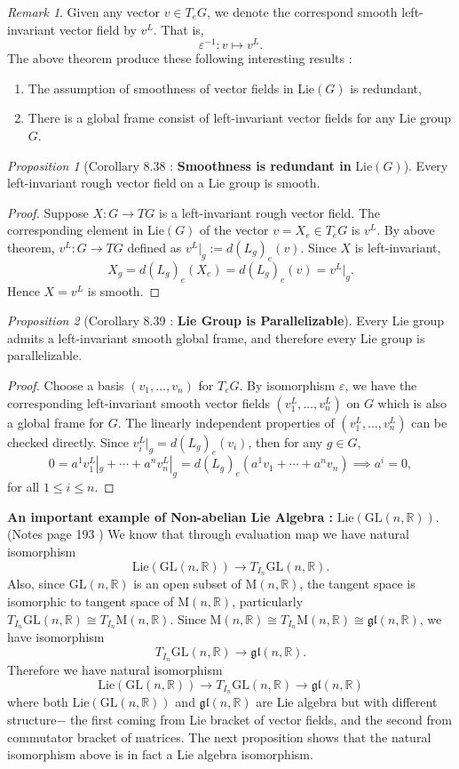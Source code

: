 \documentclass[a4paper]{article}
\theoremstyle{remark}
\newtheorem*{remark}{Remark}
\newtheorem{prop}{Proposition}
\newcommand{\er}{\mathbb{R}} %
\newcommand{\GL}{\text{GL}(n,\er)} %
\newcommand{\LieGL}{\text{Lie}(\text{GL}(n,\er))} %
\newcommand{\TInGL}{T_{I_n}\text{GL}(n,\er)} %
\newcommand{\Mtrix}{\text{M}(n,\er)} %
\newcommand{\lieMatrix}{\mathfrak{gl}(n,\er)} %
\newcommand{\isomorphic}{\cong} %
\newcommand{\LieG}{\text{Lie}(G)} %
\begin{document}
\begin{remark}
Given any  vector $v \in T_eG$, we denote the correspond smooth left-invariant vector field by $v^L$. That is,
$$
\varepsilon^{-1} : v\mapsto v^L .
$$
The above theorem produce these following interesting results : 
\begin{enumerate}
\item[(1)] The assumption of smoothness of vector fields in Lie$(G)$ is redundant,
\item[(2)] There is a global frame consist of left-invariant vector fields for any Lie group $G$.
\end{enumerate}
\end{remark}

\begin{prop}[Corollary 8.38 \cite{LeeSM} : \textbf{Smoothness is redundant in} \boldmath$\LieG$]
Every left-invariant rough vector field on a Lie group is smooth.
\end{prop}
\begin{proof}
Suppose $X : G \to TG$ is a left-invariant rough vector field. The corresponding element in Lie$(G)$ of the vector $v = X_e \in T_eG$ is $v^L$.  By  above theorem, $v^L : G \to TG$ defined as $v^L|_g := d(L_g)_e(v)$. Since $X$ is left-invariant,
$$
X_g = d(L_g)_e(X_e) = d(L_g)_e(v) = v^L|_g.
$$
Hence $X = v^L$ is smooth.
\end{proof}

\begin{prop}[Corollary 8.39 \cite{LeeSM} : \textbf{Lie Group is Parallelizable}]
Every Lie group admits a left-invariant smooth global frame, and therefore every Lie group is parallelizable. 
\end{prop}
\begin{proof}
Choose a basis $(v_1,\dots,v_n)$ for $T_eG$. By isomorphism $\varepsilon$, we have the corresponding left-invariant smooth vector fields $(v_1^L, \dots,v_n^L)$ on $G$ which is also a global frame for $G$. The linearly independent properties of $(v_1^L, \dots,v_n^L)$ can be checked directly. Since $v_i^L|_g = d(L_g)_e(v_i)$, then for any $g \in G$,
$$
0 = a^1v^L_1|_g + \cdots + a^nv^L_n|_g  = d(L_g)_e (a^1 v_1 + \cdots + a^nv_n) \implies a^i = 0,
$$
for all $1\leq i \leq n$.
\end{proof}

\textbf{An important example of Non-abelian Lie Algebra : }$\text{Lie}(\text{GL}(n,\er))$. (Notes page 193 \cite{LeeSM}) We know that through evaluation map we have natural isomorphism
$$
\text{Lie}(\text{GL}(n,\er)) \to \TInGL.
$$
Also, since $\GL$ is an open subset of $\Mtrix$, the tangent space is isomorphic to tangent space of $\Mtrix$, particularly $\TInGL \isomorphic T_{I_n}\Mtrix $. Since $\Mtrix \isomorphic T_{I_n}\Mtrix \isomorphic \lieMatrix$, we have isomorphism  
$$
\TInGL \to \lieMatrix.
$$
Therefore we have natural isomorphism
$$
\LieGL \to \TInGL \to \lieMatrix
$$
where both $\LieGL$ and $\lieMatrix$ are Lie algebra but with different structure$-$ the first coming from Lie bracket of vector fields, and the second from commutator bracket of matrices. The next proposition shows that the natural isomorphism above is in fact a Lie algebra isomorphism.
\end{document}
